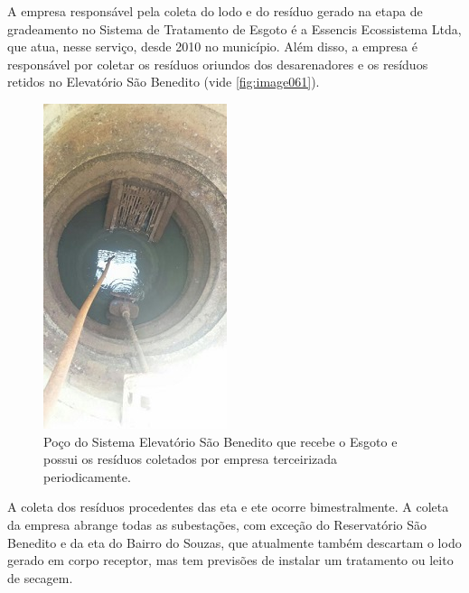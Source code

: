 	A empresa responsável pela coleta do lodo e do resíduo gerado na etapa de gradeamento no Sistema de Tratamento de Esgoto é a Essencis Ecossistema Ltda, que atua, nesse serviço, desde 2010 no município. Além disso, a empresa é responsável por coletar os resíduos oriundos dos desarenadores e os resíduos retidos no Elevatório São Benedito (vide \autoref{fig:image061}). 
	
	\begin{figure}
		\centering
		\includegraphics[width=0.75\linewidth]{produtos/prodtres/image061}
		\caption{Poço do Sistema Elevatório São Benedito que recebe o Esgoto e possui os resíduos coletados por empresa terceirizada periodicamente.}
		\label{fig:image061}
	\end{figure}
	
	
	A coleta dos resíduos procedentes das \gls{eta} e \gls{ete} ocorre bimestralmente. A coleta da empresa abrange todas as subestações, com exceção do Reservatório São Benedito e da \gls{eta} do Bairro do Souzas, que atualmente também descartam o lodo gerado em corpo receptor, mas tem previsões de instalar um tratamento ou leito de secagem.
	
